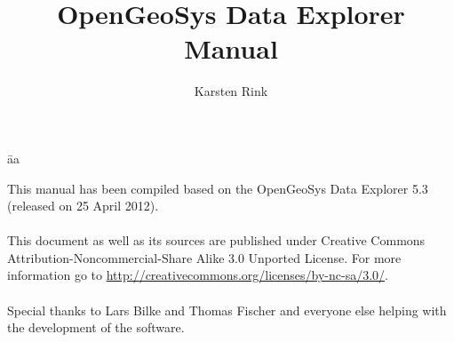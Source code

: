 \documentclass[11pt,twoside,a4paper]{book}
\title{{\LARGE OpenGeoSys Data Explorer}\\[0.5em] Manual}
\author{Karsten Rink}
\newcommand{\ogs}{OpenGeoSys }
\begin{document}
\pagestyle{empty}
\maketitle
\newpage

\vspace*{12cm}
\begin{tabbing}
\hspace*{6cm}\=aa\kill
\begin{minipage}[t]{0.62\textwidth}
\noindent This manual has been compiled based on the \ogs Data Explorer 5.3 \\
(released on 25 April 2012).\\
\\
This document as well as its sources are published under Creative Commons Attribution-Noncommercial-Share Alike 3.0 Un\-por\-ted License. For more information go to \url{http://creativecommons.org/licenses/by-nc-sa/3.0/}. \\
\\
\noindent Special thanks to Lars Bilke and Thomas Fischer and everyone else helping with the development of the software.
\end{minipage}
\> \\
\end{tabbing}

\newpage

\tableofcontents

\cleardoublepage

\pagestyle{fancy}









%

\appendix

\cleardoublepage
{}
\printindex

\cleardoublepage


\cleardoublepage
\end{document}
